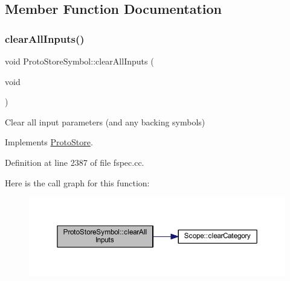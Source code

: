 \subsection{Member Function Documentation}
\mbox{\label{class_proto_store_symbol_a4542dcfd95d5a0e225c327e40208ea71}} 
\subsubsection{\texorpdfstring{clearAllInputs()}{clearAllInputs()}}
{\footnotesize\ttfamily void Proto\+Store\+Symbol\+::clear\+All\+Inputs (\begin{DoxyParamCaption}\item[{void}]{ }\end{DoxyParamCaption})\hspace{0.3cm}{\ttfamily [virtual]}}



Clear all input parameters (and any backing symbols) 



Implements \mbox{\hyperlink{class_proto_store_a2b2eab8f123a06bb4f4619e039bb1106}{Proto\+Store}}.



Definition at line 2387 of file fspec.\+cc.

Here is the call graph for this function\+:
\nopagebreak
\begin{figure}[H]
\begin{center}
\leavevmode
\includegraphics[width=350pt]{class_proto_store_symbol_a4542dcfd95d5a0e225c327e40208ea71_cgraph}
\end{center}
\end{figure}
\mbox{\label{class_proto_store_symbol_aa36f84c14205c90e18708858a3ae4ae5}} 
